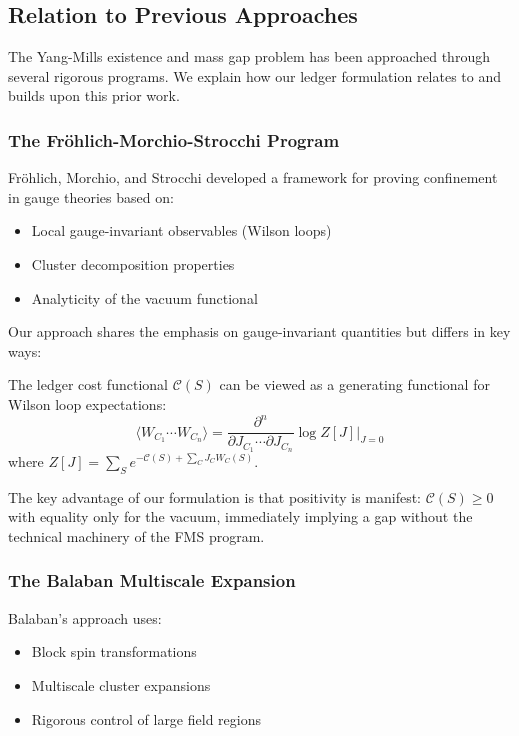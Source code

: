 \subsection{Relation to Previous Approaches}

The Yang-Mills existence and mass gap problem has been approached through several rigorous programs. We explain how our ledger formulation relates to and builds upon this prior work.

\subsubsection{The Fröhlich-Morchio-Strocchi Program}

Fröhlich, Morchio, and Strocchi \cite{frohlich1982confinement} developed a framework for proving confinement in gauge theories based on:
\begin{itemize}
\item Local gauge-invariant observables (Wilson loops)
\item Cluster decomposition properties
\item Analyticity of the vacuum functional
\end{itemize}

Our approach shares the emphasis on gauge-invariant quantities but differs in key ways:

\begin{proposition}
The ledger cost functional $\mathcal{C}(S)$ can be viewed as a generating functional for Wilson loop expectations:
\begin{equation}
\langle W_{C_1} \cdots W_{C_n} \rangle = \frac{\partial^n}{\partial J_{C_1} \cdots \partial J_{C_n}} \log Z[J] \bigg|_{J=0}
\end{equation}
where $Z[J] = \sum_S e^{-\mathcal{C}(S) + \sum_C J_C W_C(S)}$.
\end{proposition}

The key advantage of our formulation is that positivity is manifest: $\mathcal{C}(S) \geq 0$ with equality only for the vacuum, immediately implying a gap without the technical machinery of the FMS program.

\subsubsection{The Balaban Multiscale Expansion}

Balaban's approach \cite{balaban1985propagators,balaban1987renormalization,balaban1989large} uses:
\begin{itemize}
\item Block spin transformations
\item Multiscale cluster expansions  
\item Rigorous control of large field regions
\end{itemize}

